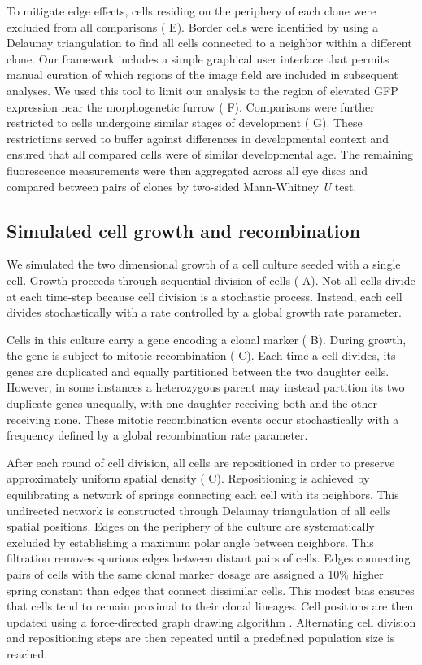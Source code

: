 \documentclass[10pt,letterpaper]{article}
\begin{document}
To mitigate edge effects, cells residing on the periphery of each clone were excluded from all comparisons ( E). Border cells were identified by using a Delaunay triangulation to find all cells connected to a neighbor within a different clone. Our framework includes a simple graphical user interface that permits manual curation of which regions of the image field are included in subsequent analyses. We used this tool to limit our analysis to the region of elevated GFP expression near the morphogenetic furrow ( F). Comparisons were further restricted to cells undergoing similar stages of development ( G). These restrictions served to buffer against differences in developmental context and ensured that all compared cells were of similar developmental age. The remaining fluorescence measurements were then aggregated across all eye discs and compared between pairs of clones by two-sided Mann-Whitney \textit{U} test.

\subsection*{Simulated cell growth and recombination}

We simulated the two dimensional growth of a cell culture seeded with a single cell. Growth proceeds through sequential division of cells ( A). Not all cells divide at each time-step because cell division is a stochastic process. Instead, each cell divides stochastically with a rate controlled by a global growth rate parameter.

Cells in this culture carry a gene encoding a clonal marker ( B). During growth, the gene is subject to mitotic recombination ( C). Each time a cell divides, its genes are duplicated and equally partitioned between the two daughter cells. However, in some instances a heterozygous parent may instead partition its two duplicate genes unequally, with one daughter receiving both and the other receiving none. These mitotic recombination events occur stochastically with a frequency defined by a global recombination rate parameter. 

After each round of cell division, all cells are repositioned in order to preserve approximately uniform spatial density ( C). Repositioning is achieved by equilibrating a network of springs connecting each cell with its neighbors. This undirected network is constructed through Delaunay triangulation of all cells spatial positions. Edges on the periphery of the culture are systematically excluded by establishing a maximum polar angle between neighbors. This filtration removes spurious edges between distant pairs of cells. Edges connecting pairs of cells with the same clonal marker dosage are assigned a 10\% higher spring constant than edges that connect dissimilar cells. This modest bias ensures that cells tend to remain proximal to their clonal lineages. Cell positions are then updated using a force-directed graph drawing algorithm \cite{Kamada1989}. Alternating cell division and repositioning steps are then repeated until a predefined population size is reached. 
\end{document}
